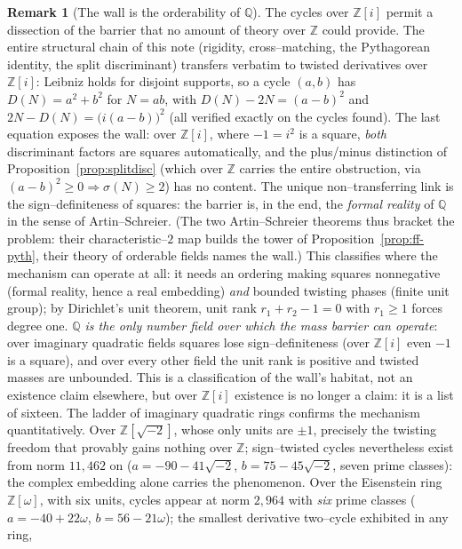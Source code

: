 \documentclass[11pt]{article}
\theoremstyle{definition}
\newtheorem{remark}[theorem]{Remark}
\begin{document}
\begin{remark}[The wall is the orderability of $\mathbb{Q}$]\label{rem:orderable}
The cycles over $\mathbb{Z}[i]$ permit a dissection of the barrier that no amount of theory over
$\mathbb{Z}$ could provide. The entire structural chain of this note (rigidity, cross--matching, the
Pythagorean identity, the split discriminant) transfers verbatim to twisted derivatives over
$\mathbb{Z}[i]$: Leibniz holds for disjoint supports, so a cycle $(a,b)$ has $D(N)=a^2+b^2$ for $N=ab$,
with $D(N)-2N=(a-b)^2$ and $2N-D(N)=\bigl(i(a-b)\bigr)^2$ (all verified exactly on the cycles found).
The last equation exposes the wall: over $\mathbb{Z}[i]$, where $-1=i^2$ is a square, \emph{both}
discriminant factors are squares automatically, and the plus/minus distinction of
Proposition~\ref{prop:splitdisc} (which over $\mathbb{Z}$ carries the entire obstruction, via
$(a-b)^2\ge0\Rightarrow\sigma(N)\ge2$) has no content. The unique non--transferring link is the
sign--definiteness of squares: the barrier is, in the end, the \emph{formal reality} of $\mathbb{Q}$ in
the sense of Artin--Schreier. (The two Artin--Schreier theorems thus bracket the problem: their
characteristic--$2$ map builds the tower of Proposition~\ref{prop:ff-pyth}, their theory of orderable
fields names the wall.) This classifies where the mechanism can operate at all: it needs an ordering
making squares nonnegative (formal reality, hence a real embedding) \emph{and} bounded twisting phases
(finite unit group); by Dirichlet's unit theorem, unit rank $r_1+r_2-1=0$ with $r_1\ge1$ forces degree
one. \emph{$\mathbb{Q}$ is the only number field over which the mass barrier can operate}: over
imaginary quadratic fields squares lose sign--definiteness (over $\mathbb{Z}[i]$ even $-1$ is a square),
and over every other field the unit rank is positive and twisted masses are unbounded. This is a
classification of the wall's habitat, not an existence claim elsewhere, but over $\mathbb{Z}[i]$
existence is no longer a claim: it is a list of sixteen. The ladder of imaginary quadratic rings
confirms the mechanism quantitatively. Over $\mathbb{Z}[\sqrt{-2}]$, whose only units are $\pm1$,
precisely the twisting freedom that provably gains nothing over $\mathbb{Z}$; sign--twisted cycles
nevertheless exist from norm $11{,}462$ on ($a=-90-41\sqrt{-2}$, $b=75-45\sqrt{-2}$, seven prime
classes): the complex embedding alone carries the phenomenon. Over the Eisenstein ring
$\mathbb{Z}[\omega]$, with six units, cycles appear at norm $2{,}964$ with \emph{six} prime classes
($a=-40+22\omega$, $b=56-21\omega$); the smallest derivative two--cycle exhibited in any ring,

\end{remark}
\end{document}
